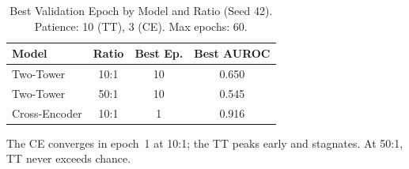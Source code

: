 \documentclass[journal]{IEEEtran}
\begin{document}
\begin{table}[!t]
  \caption{Best Validation Epoch by Model and Ratio (Seed 42).
    Patience: 10 (TT), 3 (CE). Max epochs: 60.}
  \label{tab:convergence}
  \centering
  \footnotesize
  \begin{tabular}{@{}lccc@{}}
    \hline
    Model & Ratio & Best Ep. & Best AUROC \\
    \hline
    Two-Tower     & 10:1 & 10 & 0.650 \\
    Two-Tower     & 50:1 & 10 & 0.545 \\
    Cross-Encoder & 10:1 & 1  & 0.916 \\
    \hline
  \end{tabular}

  \smallskip
  \scriptsize
  The CE converges in epoch~1 at 10:1; the TT peaks
  early and stagnates. At 50:1, TT never exceeds chance.
\end{table}



\end{document}
